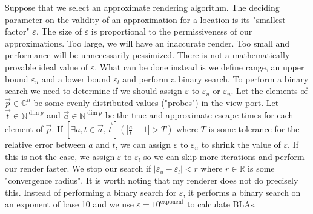 \documentclass{article}
\begin{document}
\par Suppose that we select an approximate rendering algorithm. The deciding parameter on the validity of  an approximation for a location is its "smallest factor" $\varepsilon$. The size of $\varepsilon$ is proportional to the permissiveness of our approximations. Too large, we will have an inaccurate render. Too small and performance will be unnecessarily pessimized. There is not a mathematically provable ideal value of $\varepsilon$. What can be done instead is we define range, an upper bound $\varepsilon_u$ and a lower bound $\varepsilon_l$ and perform a binary search. To perform a binary search we need to determine if we should assign $\varepsilon$ to $\varepsilon_u$ or $\varepsilon_u$. Let the elements of $\vec{p}\in \mathbb{C}^n$ be some evenly distributed values ("probes") in the view port. Let $\vec{t}\in{\mathbb{N}^{\dim{p}}}$ and $\vec{a}\in{\mathbb{N}^{\dim{p}}}$ be the true and approximate escape times for each element of $\vec{p}$. If $[\exists a,t\in\vec{a},\vec{t}](|\frac{a}{t} - 1| > T)$ where $T$ is some tolerance for the relative error between $a$ and $t$, we can assign $\varepsilon$ to $\varepsilon_u$ to shrink the value of $\varepsilon$. If this is not the case, we assign $\varepsilon$ to $\varepsilon_l$ so we can skip more iterations and perform our render faster. We stop our search if $|\varepsilon_u - \varepsilon_l| < r$ where $r\in\mathbb{R}$ is some "convergence radius".
It is worth noting that my renderer does not do precisely this. Instead of performing a binary search for $\varepsilon$, it performs a binary search on an exponent of base 10 and we use $\varepsilon=10^\text{exponent}$ to calculate BLAs.
\end{document}
